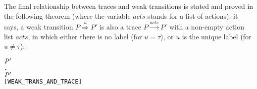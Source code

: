 The final relationship between traces and weak transitions is stated
and proved in the following theorem
(where the  variable $acts$ stands for
a list of actions); 
it says, a weak transition $P\overset{u}{\Rightarrow}P'$ is also a
trace $P\overset{acts}{\longrightarrow}P'$ with a
 non-empty action list $acts$, in which either there is no label (for $u = \tau$), or 
$u$ is the unique label (for $u \neq \tau$):
\begin{alltt}
\HOLTokenTurnstile{}  \HOLTokenWeakTransBegin{}\HOLTokenWeakTransEnd \ensuremath{\HOLFreeVar{P}\sp{\prime}} \HOLSymConst{\HOLTokenEquiv{}}
   \HOLSymConst{\HOLTokenExists{}}.
          \ensuremath{\HOLFreeVar{P}\sp{\prime}} \HOLSymConst{\HOLTokenConj{}} \HOLSymConst{\HOLTokenNeg{}}  \HOLSymConst{\HOLTokenConj{}}
         \HOLSymConst{\ensuremath{=}} \HOLSymConst{\ensuremath{\tau}}       \hfill{[WEAK_TRANS_AND_TRACE]}
\end{alltt}


